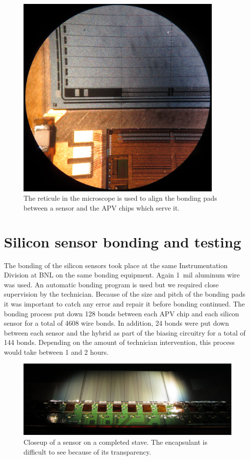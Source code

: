 \documentclass[preprint,12pt]{elsarticle}
\begin{document}
\begin{figure}[h]
\begin{center}
\includegraphics[width=4in, keepaspectratio=true, angle=0]{graphics/si_align.jpg}
\caption{The reticule in the microscope is used to align the bonding pads
between a sensor and the APV chips which serve it.
\label{fig:si_align}}
\end{center}
\end{figure}

\section{Silicon sensor bonding and testing}
The bonding of the silicon sensors took place at the same Instrumentation
Division at BNL on the same bonding equipment. Again 1~mil aluminum wire was
used. An automatic bonding program is used but we required close supervision by
the technician. Because of the size and pitch of the bonding pads it was
important to catch any error and repair it before bonding continued. The
bonding process put down 128 bonds between each APV chip and each silicon sensor
for a total of 4608 wire bonds. In addition, 24 bonds were put down between
each sensor and the hybrid as part of the biasing circuitry for a total of 144
bonds. Depending on the amount of technician intervention, this process would
take between 1 and 2 hours.

\begin{figure}
\begin{center}
\includegraphics[width=6.5in, keepaspectratio=true, angle=0]{graphics/si_bonded.jpg}
\caption{Closeup of a sensor on a completed stave.  The encapsulant is difficult
to see because of its transparency.
\label{fig:si_bonded}}
\end{center}
\end{figure}
\end{document}
